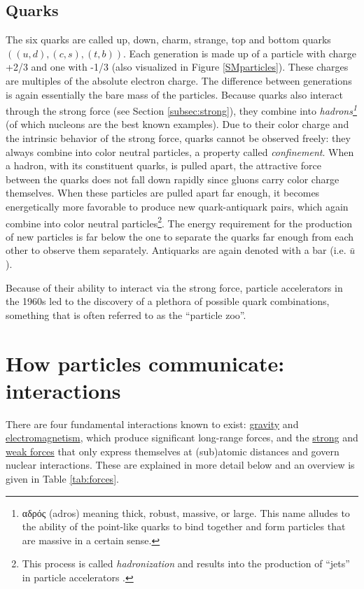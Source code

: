 \subsection{Quarks}
\label{sub:quarks}
The six quarks are called up, down, charm, strange, top and bottom quarks $((u,d),(c,s),(t,b))$.
Each generation is made up of a particle with charge +2/3 and one with -1/3 (also visualized in Figure \ref{SMparticles}). These charges are multiples of the absolute electron charge.
The difference between generations is again essentially the bare mass of the particles. Because quarks also interact through the strong force (see Section \ref{subsec:strong}), they combine into 
\textit{hadrons\footnote{\gr αδρός \en (adros) meaning thick, robust, massive, or large. This name alludes to the ability of the point-like quarks to bind together and form particles that are massive in a certain sense.}} (of which nucleons are the best known examples). Due to their color charge and the intrinsic behavior of the strong force, quarks cannot be observed freely: they always combine into color neutral particles, a property called \textit{confinement}. When a hadron, with its constituent quarks, is pulled apart, the attractive force between the quarks does not fall down rapidly since gluons carry color charge themselves. When these particles are pulled apart far enough, it becomes energetically more favorable to produce new quark-antiquark pairs, which again combine into color neutral particles\footnote{This process is called \textit{hadronization} and results into the production of ``jets'' in particle accelerators \cite{cmsjetsurl}.}. The energy requirement for the production of new particles is far below the one to separate the quarks far enough from each other to observe them separately. Antiquarks are again denoted with a bar (i.e. $\bar{u}$).

Because of their ability to interact via the strong force, particle accelerators in the 1960s led to the discovery of a plethora of possible quark combinations, something that is often referred to as the ``particle zoo''.



\section{How particles communicate: interactions}

There are four fundamental interactions known to exist: \underline{gravity} and \underline{electromagnetism}, which produce significant long-range forces, and the \underline{strong} and \underline{weak forces} that only express themselves at (sub)atomic distances and govern nuclear interactions. These are explained in more detail below and an overview is given in Table \ref{tab:forces}.

